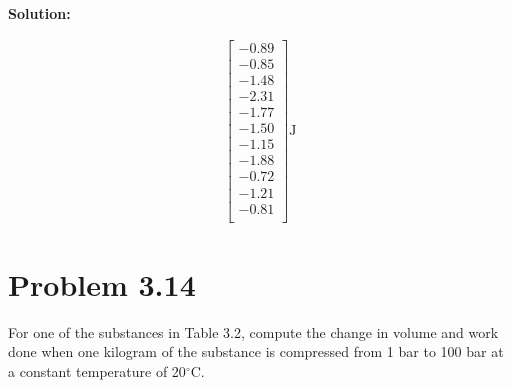 \documentclass{article}
\newenvironment{solution}{\par\noindent\textbf{\\Solution:\\}}{\par\medskip}
\begin{document}
\begin{solution}
\begin{center}
{\begin{minipage}{0pt}
\begin{align*}
\begin{bmatrix}
                          -0.89 \\
                          -0.85 \\
                          -1.48 \\
                          -2.31 \\
                          -1.77 \\
                          -1.50 \\
                          -1.15 \\
                          -1.88 \\
                          -0.72 \\
                          -1.21 \\
                          -0.81 \\
                      \end{bmatrix}
                      \si{\joule}
                  \end{align*}
              \end{minipage}
              \hspace{0pt}
          }
      \end{center}
\end{solution}

\section*{Problem 3.14}
For one of the substances in Table 3.2, compute the change in volume and work done when one kilogram of the substance is compressed from 1 bar to 100 bar at a constant temperature of 20$^\circ$C.
\end{document}
